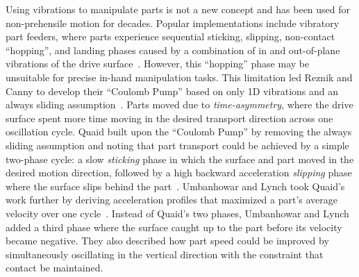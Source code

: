 

Using vibrations to manipulate parts is not a new concept and has been used for non-prehensile motion for decades. 
%
Popular implementations include vibratory part feeders, where parts experience sequential sticking, slipping, non-contact ``hopping'', and landing phases caused by a combination of in and out-of-plane vibrations of the drive surface~\cite{lim1997conveying}. 
%
However, this ``hopping'' phase may be unsuitable for precise in-hand manipulation tasks. 
%
This limitation led Reznik and Canny to develop their ``Coulomb Pump'' based on only 1D vibrations and an always sliding assumption~\cite{reznik1998coulomb}. 
%
Parts moved due to \textit{time-asymmetry}, where the drive surface spent more time moving in the desired transport direction across one oscillation cycle.
%
Quaid built upon the ``Coulomb Pump'' by removing the always sliding assumption and noting that part transport could be achieved by a simple two-phase cycle: a slow \textit{sticking} phase in which the surface and part moved in the desired motion direction, followed by a high backward acceleration \textit{slipping} phase where the surface slips behind the part~\cite{quaid1999feeder}.
%
Umbanhowar and Lynch took Quaid's work further by deriving acceleration profiles that maximized a part's average velocity over one cycle~\cite{umbanhowar2008optimal}.
%
Instead of Quaid's two phases, Umbanhowar and Lynch added a third phase where the surface caught up to the part before its velocity became negative.
% 
They also described how part speed could be improved by simultaneously oscillating in the vertical direction with the constraint that contact be maintained.

